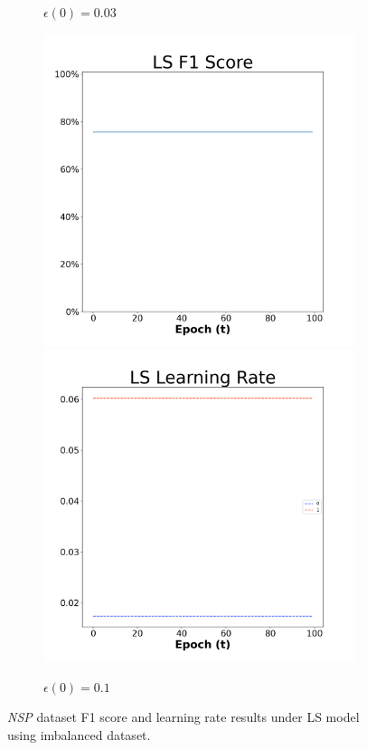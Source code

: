 \begin{figure}[H]
\begin{subfigure}{0.3\textwidth}
  \caption{$\epsilon(0)=0.03$}
\end{subfigure}\hfil %
\begin{subfigure}{0.3\textwidth}
  \includegraphics[width=\linewidth]{images/exper2/NSP/LS_0.1_f1.png}
  \includegraphics[width=\linewidth]{images/exper2/NSP/LS_0.1_lr.png}
  \caption{$\epsilon(0)=0.1$}
\end{subfigure}

\caption{\textit{NSP} dataset F1 score and learning rate results under LS model using imbalanced dataset.}
\end{figure}

